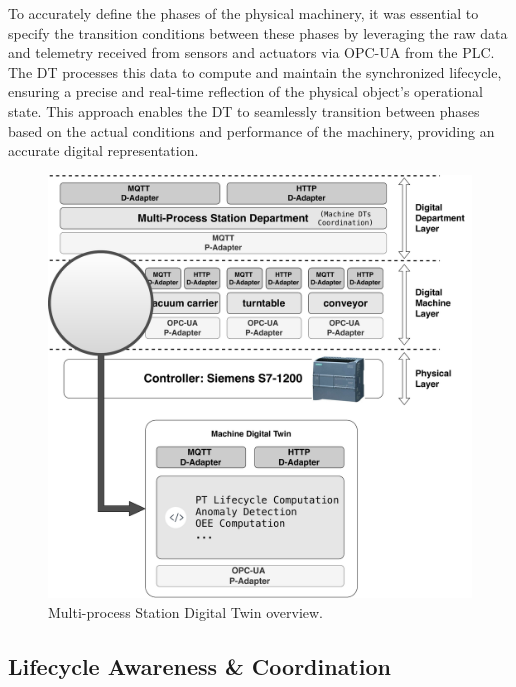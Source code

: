 To accurately define the phases of the physical machinery, it was essential to specify the transition conditions between these phases by leveraging the raw data and telemetry received from sensors and actuators via OPC-UA from the PLC. The DT processes this data to compute and maintain the synchronized lifecycle, ensuring a precise and real-time reflection of the physical object's operational state. This approach enables the DT to seamlessly transition between phases based on the actual conditions and performance of the machinery, providing an accurate digital representation.

\begin{figure}[t]
    \setlength{\belowcaptionskip}{-13pt}
    \centering
    \includegraphics[width=\columnwidth]{figures/dt-lifecycle/mps_dt_structure_2.pdf}
    \caption{Multi-process Station Digital Twin overview.}
    \label{fig:multiprocess-station-dt-structure}
\end{figure}

\subsection{Lifecycle Awareness \& Coordination}


